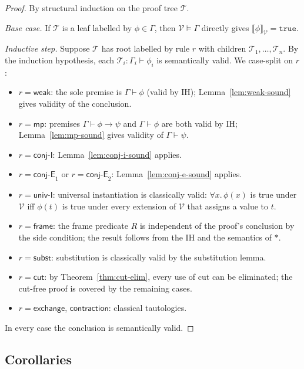 \documentclass[11pt]{article}
\newcommand{\PTree}{\mathcal{T}}              %
\newcommand{\Prov}[2]{#1 \vdash #2}           %
\newcommand{\Val}{\mathcal{V}}                %
\newcommand{\Sat}{\models}                    %
\newcommand{\sem}[1]{\llbracket #1 \rrbracket}%
\newcommand{\MP}{\mathsf{mp}}                 %
\newcommand{\WeakR}{\ensuremath{\mathsf{weak}}}            %
\newcommand{\ConjI}{\mathsf{conj\text{-}I}}   %
\newcommand{\ConjE}{\mathsf{conj\text{-}E}}   %
\newcommand{\UnivI}{\mathsf{univ\text{-}I}}   %
\newcommand{\FrameR}{\mathsf{frame}}          %
\newcommand{\SubstR}{\mathsf{subst}}          %
\newcommand{\CutR}{\ensuremath{\mathsf{cut}}}              %
\begin{document}
\begin{proof}
  By structural induction on the proof tree $\PTree$.

  \emph{Base case.}  If $\PTree$ is a leaf labelled by $\phi \in
  \Gamma$, then $\Val \Sat \Gamma$ directly gives
  $\sem{\phi}_\Val = \mathtt{true}$.

  \emph{Inductive step.}  Suppose $\PTree$ has root labelled by rule
  $r$ with children $\PTree_1, \ldots, \PTree_n$.  By the induction
  hypothesis, each $\PTree_i : \Prov{\Gamma_i}{\phi_i}$ is
  semantically valid.  We case-split on $r$:

  \begin{itemize}
    \item $r = \WeakR$: the sole premise is $\Prov{\Gamma}{\phi}$
      (valid by IH); Lemma~\ref{lem:weak-sound} gives validity of
      the conclusion.
    \item $r = \MP$: premises $\Prov{\Gamma}{\phi \to \psi}$ and
      $\Prov{\Gamma}{\phi}$ are both valid by IH;
      Lemma~\ref{lem:mp-sound} gives validity of $\Prov{\Gamma}{\psi}$.
    \item $r = \ConjI$: Lemma~\ref{lem:conj-i-sound} applies.
    \item $r = \ConjE_1$ or $r = \ConjE_2$: Lemma~\ref{lem:conj-e-sound}
      applies.
    \item $r = \UnivI$: universal instantiation is classically valid:
      $\forall x.\,\phi(x)$ is true under $\Val$ iff $\phi(t)$ is true
      under every extension of $\Val$ that assigns a value to $t$.
    \item $r = \FrameR$: the frame predicate $R$ is independent of
      the proof's conclusion by the side condition; the result follows
      from the IH and the semantics of $*$.
    \item $r = \SubstR$: substitution is classically valid by the
      substitution lemma.
    \item $r = \CutR$: by Theorem~\ref{thm:cut-elim}, every use of
      cut can be eliminated; the cut-free proof is covered by the
      remaining cases.
    \item $r = \mathsf{exchange}$, $\mathsf{contraction}$:
      classical tautologies.
  \end{itemize}

  In every case the conclusion is semantically valid.
\end{proof}

\subsection{Corollaries}
\end{document}
